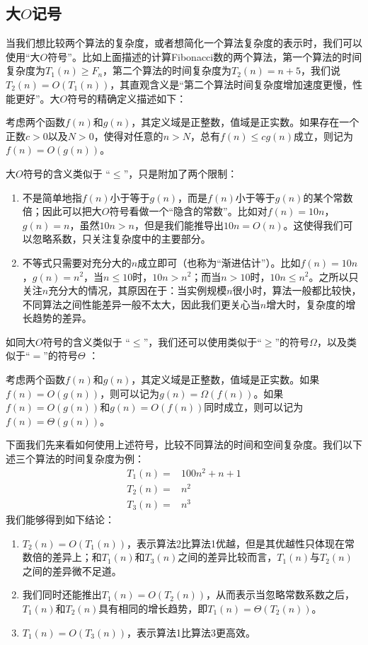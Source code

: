 \subsection{大$O$记号}
	当我们想比较两个算法的复杂度，或者想简化一个算法复杂度的表示时，我们可以使用“大$O$符号”。比如上面描述的计算Fibonacci数的两个算法，第一个算法的时间复杂度为$T_1(n) \geq F_n$，第二个算法的时间复杂度为$T_2(n) = n + 5$，我们说$T_2(n) = O( T_1(n) )$，其直观含义是“第二个算法时间复杂度增加速度更慢，性能更好”。大$O$符号的精确定义描述如下：
\begin{definition}[大$O$记号]
	考虑两个函数$f(n)$和$g(n)$，其定义域是正整数，值域是正实数。如果存在一个正数$c >0$以及$N > 0$，使得对任意的$n > N$，总有$f(n) \leq c g(n)$成立，则记为$f(n) = O(g(n))$。
\end{definition}
	大$O$符号的含义类似于 “$\leq$”，只是附加了两个限制：
	\begin{enumerate}[(1)]
		\item  不是简单地指$f(n)$小于等于$g(n)$，而是$f(n)$小于等于$g(n)$的某个常数倍；因此可以把大$O$符号看做一个“隐含的常数”\cite{SipserBook}。比如对$f(n) = 10 n$，$g(n) = n$，虽然$10 n > n$，但是我们能推导出$10 n  = O(n)$。这使得我们可以忽略系数，只关注复杂度中的主要部分。
		\item 不等式只需要对充分大的$n$成立即可（也称为“渐进估计”）。比如$f(n) = 10 n $，$g(n) = n^2$，当$n \leq 10$时，$10 n > n^2$；而当$n> 10$时，$10 n \leq  n^2$。之所以只关注$n$充分大的情况，其原因在于：当实例规模$n$很小时，算法一般都比较快，不同算法之间性能差异一般不太大，因此我们更关心当$n$增大时，复杂度的增长趋势的差异。
	\end{enumerate}	
	如同大$O$符号的含义类似于 “$\leq$”，我们还可以使用类似于“$\geq$”的符号$\Omega$，以及类似于“$=$”的符号$\Theta$ \cite{Knuth1976}：
\begin{definition}
	考虑两个函数$f(n)$和$g(n)$，其定义域是正整数，值域是正实数。如果$f(n) = O(g(n))$，则可以记为$g(n) = \Omega( f(n))$。如果$f(n) = O(g(n))$和$g(n) = O(f(n))$同时成立，则可以记为$f(n) = \Theta(g(n))$。
\end{definition}
	

	下面我们先来看如何使用上述符号，比较不同算法的时间和空间复杂度。我们以下述三个算法的时间复杂度为例：
	\begin{eqnarray}
T_1(n) =& 100 n^2 + n + 1  \nonumber \\
 	T_2(n) =& n^2  \nonumber\\
 	T_3(n) =& n^3  \nonumber
	\end{eqnarray}
我们能够得到如下结论： 
	\begin{enumerate}[(1)]
		\item   $T_2(n) = O(T_1(n))$，表示算法2比算法1优越，但是其优越性只体现在常数倍的差异上；和$T_1(n)$和$T_3(n)$之间的差异比较而言，$T_1(n)$与$T_2(n)$之间的差异微不足道。  
		\item   我们同时还能推出$T_1(n) = O(T_2(n))$，从而表示当忽略常数系数之后，$T_1(n)$和$T_2(n)$具有相同的增长趋势，即$T_1(n) = \Theta(T_2(n))$。
		\item  $T_1(n) = O(T_3(n) )$，表示算法1比算法3更高效。
	\end{enumerate}	

